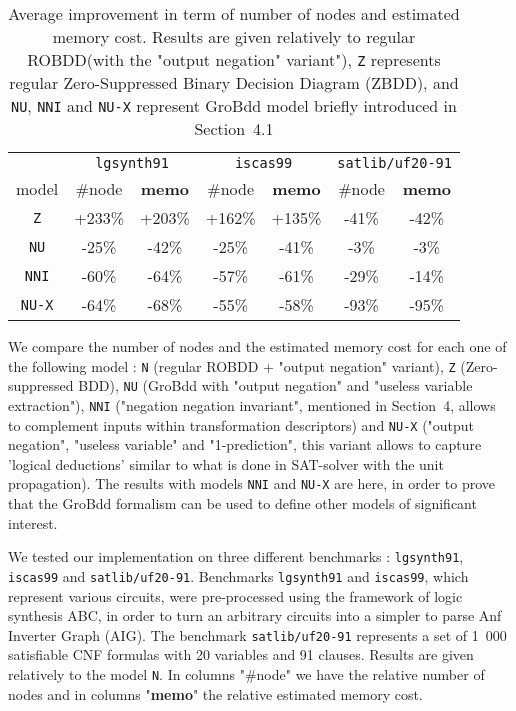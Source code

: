 \documentclass[a4paper,10pt]{article}
\begin{document}
\begin{table}
\center
\begin{tabular}{c | c | c | c | c | c | c }
& \multicolumn{2}{c|}{\texttt{lgsynth91}} & \multicolumn{2}{c|}{\texttt{iscas99}} & \multicolumn{2}{c}{\texttt{satlib/uf20-91}} \\
model         & \#node & \textbf{memo} & \#node & \textbf{memo} & \#node & \textbf{memo} \\
\texttt{Z}    & +233\% & +203\%        & +162\% & +135\%        & -41\%  & -42\%         \\
\texttt{NU}   & -25\%  & -42\%         & -25\%  & -41\%         & -3\%   & -3\%          \\
\texttt{NNI}  & -60\%  & -64\%         & -57\%  & -61\%         & -29\%  & -14\%         \\
\texttt{NU-X} & -64\%  & -68\%         & -55\%  & -58\%         & -93\%  & -95\%         \\
\end{tabular}
\caption{Average improvement in term of number of nodes and estimated memory cost. Results are given relatively to regular ROBDD(with the "output negation" variant"), \texttt{Z} represents regular Zero-Suppressed Binary Decision Diagram (ZBDD), and \texttt{NU}, \texttt{NNI} and \texttt{NU-X} represent GroBdd model briefly introduced in Section~4.1}
\label{results}
\end{table}

We compare the number of nodes and the estimated memory cost for each one of the following model : \texttt{N} (regular ROBDD + "output negation" variant), \texttt{Z} (Zero-suppressed BDD), \texttt{NU} (GroBdd with "output negation" and "useless variable extraction"), \texttt{NNI} ("negation negation invariant", mentioned in Section~4, allows to complement inputs within transformation descriptors) and \texttt{NU-X} ("output negation", "useless variable" and "1-prediction", this variant allows to capture 'logical deductions' similar to what is done in SAT-solver with the unit propagation).
The results with models \texttt{NNI} and \texttt{NU-X} are here, in order to prove that the GroBdd formalism can be used to define other models of significant interest.

We tested our implementation on three different benchmarks : \texttt{lgsynth91}\cite{BenchLgsynth91}, \texttt{iscas99}\cite{BenchIscas99} and \texttt{satlib/uf20-91}\cite{BenchSatlib}.
Benchmarks \texttt{lgsynth91} and \texttt{iscas99}, which represent various circuits, were pre-processed using the framework of logic synthesis ABC\cite{Abc}, in order to turn an arbitrary circuits into a simpler to parse Anf Inverter Graph (AIG).
The benchmark \texttt{satlib/uf20-91} represents a set of 1~000 satisfiable CNF formulas with 20 variables and 91 clauses.
Results are given relatively to the model \texttt{N}.
In columns "\#node" we have the relative number of nodes and in columns "\textbf{memo}" the relative estimated memory cost.
\end{document}
